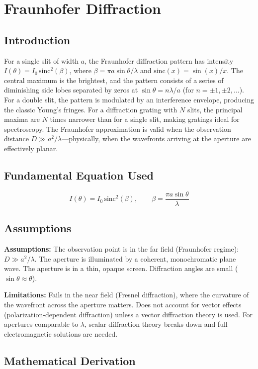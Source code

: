 \chapter{Fraunhofer Diffraction}

\section*{Introduction}

For a single slit of width $a$, the Fraunhofer diffraction pattern has intensity $I(\theta) = I_0\,\text{sinc}^2(\beta)$, where $\beta = \pi a \sin\theta/\lambda$ and $\text{sinc}(x) = \sin(x)/x$. The central maximum is the brightest, and the pattern consists of a series of diminishing side lobes separated by zeros at $\sin\theta = n\lambda/a$ (for $n = \pm 1, \pm 2, \ldots$). For a double slit, the pattern is modulated by an interference envelope, producing the classic Young's fringes. For a diffraction grating with $N$ slits, the principal maxima are $N$ times narrower than for a single slit, making gratings ideal for spectroscopy. The Fraunhofer approximation is valid when the observation distance $D \gg a^2/\lambda$---physically, when the wavefronts arriving at the aperture are effectively planar.
\section*{Fundamental Equation Used}

\[
I(\theta) = I_0\,\text{sinc}^2(\beta),\qquad \beta = \frac{\pi a \sin\theta}{\lambda}
\]
\section*{Assumptions}

\textbf{Assumptions:} The observation point is in the far field (Fraunhofer regime): $D \gg a^2/\lambda$. The aperture is illuminated by a coherent, monochromatic plane wave. The aperture is in a thin, opaque screen. Diffraction angles are small ($\sin\theta \approx \theta$).


\textbf{Limitations:} Fails in the near field (Fresnel diffraction), where the curvature of the wavefront across the aperture matters. Does not account for vector effects (polarization-dependent diffraction) unless a vector diffraction theory is used. For apertures comparable to $\lambda$, scalar diffraction theory breaks down and full electromagnetic solutions are needed.


\section*{Mathematical Derivation}

